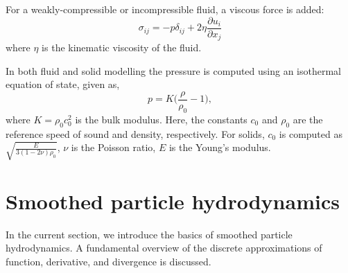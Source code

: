 For a weakly-compressible or incompressible fluid, a viscous force is added:
\begin{equation}
  \label{eq:fluid-stress-decomposition}
  \sigma_{ij} = - p \delta_{ij} + 2 \eta \frac{\partial u_i}{\partial x_j}
\end{equation}
where $\eta$ is the kinematic viscosity of the fluid.

In both fluid and solid modelling the pressure is computed using an
isothermal equation of state, given as,
\begin{equation}
  \label{eq:pressure-equation}
  p = K \bigg(\frac{\rho}{\rho_{0}} - 1 \bigg),
\end{equation}
where $K = \rho_{0} c_0^2$ is the bulk modulus. Here, the constants $c_0$ and
$\rho_0$ are the reference speed of sound and density, respectively. For solids,
$c_0$ is computed as $\sqrt{\frac{E}{3 (1 - 2 \nu)\rho_{0}}}$, $\nu$ is the
Poisson ratio, $E$ is the Young's modulus.


\section{Smoothed particle hydrodynamics}
In the current section, we introduce the basics of smoothed particle
hydrodynamics. A fundamental overview of the discrete approximations of
function, derivative, and divergence is discussed.

